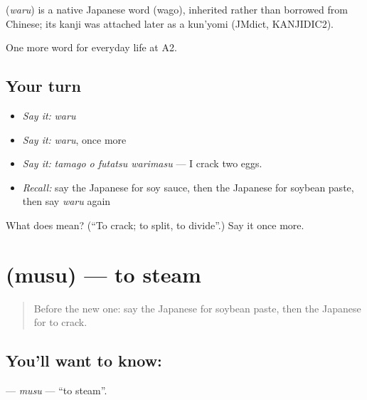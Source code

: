 \begin{cousinweb}
\textbf{} (\emph{waru}) is a native Japanese word (wago), inherited rather than borrowed from Chinese; its kanji was attached later as a kun'yomi (JMdict, KANJIDIC2).
\end{cousinweb}

\begin{grammarlens}[title={What you've built}]
One more word for everyday life at A2.
\end{grammarlens}

\subsection*{Your turn}
\begin{itemize}
\raggedright
  \item \emph{Say it:} \emph{waru}
  \item \emph{Say it:} \emph{waru}, once more
  \item \emph{Say it:} \emph{tamago o futatsu warimasu} — I crack two eggs.
  \item \emph{Recall:} say the Japanese for soy sauce, then the Japanese for soybean paste, then say \emph{waru} again
\end{itemize}

\begin{tcolorbox}[breakable,colback=teal!4,colframe=teal!35!black,title={Before you move on}]
What does  mean? (\textquotedblleft{}To crack; to split, to divide\textquotedblright{}.) Say it once more.
\end{tcolorbox}
\section[\texorpdfstring{\ja{むす} (musu)}{むす (musu)}]{ (musu) — to steam}

\label{lesson:JA-C176-musu}



\begin{quote}
Before the new one: say the Japanese for soybean paste, then the Japanese for to crack.
\end{quote}

\subsection*{You'll want to know: }
\textbf{} — \emph{musu} — \textquotedblleft{}to steam\textquotedblright{}.

